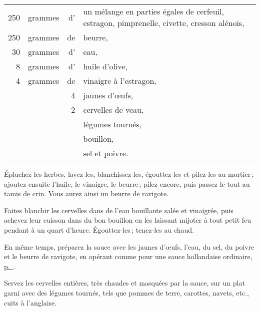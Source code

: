 \footnotesize
\begin{longtable}{rrrp{15em}}
    250 & grammes & d' & un mélange en parties égales de cerfeuil,
                         estragon, pimprenelle, civette, cresson alénois,                                 \\
    250 & grammes & de & beurre,                                                                          \\
     30 & grammes & d' & eau,                                                                             \\
      8 & grammes & d' & huile d'olive,                                                                   \\
      4 & grammes & de & vinaigre à l’estragon,                                                           \\
        &         &  4 & jaunes d'œufs,                                                                   \\
        &         &  2 & cervelles de veau,                                                               \\
        &         &    & légumes tournés,                                                                 \\
        &         &    & bouillon,                                                                        \\
        &         &    & sel et poivre.                                                                   \\
\end{longtable}
\normalsize

Épluchez les herbes, lavez-les, blanchissez-les, égouttez-les et pilez-les au
mortier ; ajoutez ensuite l'huile, le vinaigre, le beurre ; pilez encore, puis
passez le tout au tamis de crin. Vous aurez ainsi un beurre de ravigote.

Faites blanchir les cervelles dans de l’eau bouillante salée et vinaigrée, puis
achevez leur cuisson dans du bon bouillon en les laissant mijoter à tout petit feu
pendant à un quart d'heure. Égouttez-les ; tenez-les au chaud.

En même temps, préparez la sauce avec les jaunes d'œufs, l'eau, du sel, du
poivre et le beurre de ravigote, en opérant comme pour une sauce hollandaise
ordinaire, \hyperlink{p0362}{p. \pageref{pg0362}}.

Servez les cervelles entières, très chaudes et masquées par la sauce, sur un
plat garni avec des légumes tournés, tels que pommes de terre, carottes,
navets, etc., cuits à l'anglaise.

